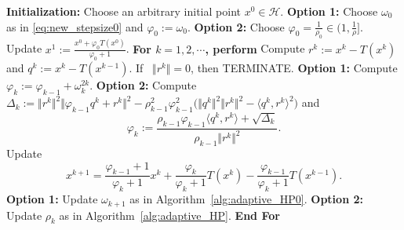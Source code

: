 \documentclass{article}
\theoremstyle{plain}
\theoremstyle{definition}
\newcommand{\norms}[1]{\Vert#1\Vert}
\newcommand{\iprods}[1]{\langle #1\rangle}
\newcommand{\0}{\boldsymbol{0}}
\begin{document}
\begin{algorithm}[!htbp]
\caption{(Parameter-Free Nesterov's Accelerated Fixed-Point Algorithm)}\label{alg:adaptive_NesFP}
\begin{algorithmic}[1]
\State\textbf{Initialization:} Choose an arbitrary initial point $x^0\in\mathcal H$.
\State \textbf{Option 1:} Choose $\omega_0$ as in \eqref{eq:new_stepsize0} and $\varphi_0 := \omega_0$.
\textbf{Option 2:} Choose $\varphi_0 = \frac{1}{\rho_0} \in \big(1, \frac{1}{\rho}\big]$.
\State Update $x^1 := \frac{x^0 + \varphi_0T(x^0)}{\varphi_0 + 1}$.
\State \textbf{For $k = 1, 2, \cdots$, perform}
\State\hspace{3ex}Compute $r^k := x^k - T(x^k)$ and $q^k := x^k - T(x^{k-1})$.
\State\hspace{3ex}If ~$\norms{r^k} = 0$,  then TERMINATE.
\State\hspace{3ex}\textbf{Option 1:} Compute $\varphi_{k} := \varphi_{k-1} + \omega_k^{2k}$.
\State\hspace{3ex}\textbf{Option 2:} Compute $\Delta_k := \norms{r^k}^2\norms{\varphi_{k-1}q^k + r^k}^2 - \rho_{k-1}^2\varphi_{k-1}^2\big(\norms{q^k}^2\norms{r^k}^2  - \iprods{q^k, r^k}^2 \big)$ and 
\begin{equation*}
\varphi_k :=   \frac{\rho_{k-1}\varphi_{k-1}\iprods{q^k, r^k} + \sqrt{\Delta_k}}{\rho_{k-1}\norms{r^k}^2}.
\end{equation*}
\State\hspace{3ex}Update
\begin{equation*}
x^{k+1} =  \frac{\varphi_{k-1} + 1}{\varphi_k + 1}x^k +  \frac{\varphi_k}{\varphi_k + 1}T(x^k) - \frac{\varphi_{k-1}}{\varphi_k + 1}T(x^{k-1}).
\end{equation*}
\State\hspace{3ex}\textbf{Option 1:} Update $\omega_{k+1}$ as in Algorithm~\ref{alg:adaptive_HP0}.
\State\hspace{3ex}\textbf{Option 2:} Update $\rho_k$ as in Algorithm~\ref{alg:adaptive_HP}.
\State\textbf{End For}
\end{algorithmic}
\end{algorithm}
\end{document}
